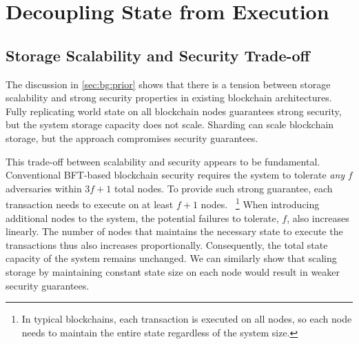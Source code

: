 \section{Decoupling State from Execution}
\label{sec:approach}

\subsection{Storage Scalability and Security Trade-off}
\label{sec:approach:tradeoff}

\fi

The discussion in \autoref{sec:bg:prior} shows that there is a tension between storage scalability and strong security properties in existing blockchain architectures.
Fully replicating world state on all blockchain nodes guarantees strong security, but the system storage capacity does not scale.
Sharding can scale blockchain storage, but the approach compromises security guarantees.

This trade-off between scalability and security appears to be fundamental.
Conventional BFT-based blockchain security requires the system to tolerate \emph{any} $f$ adversaries within $3f + 1$ total nodes.
To provide such strong guarantee, each transaction needs to execute on at least $f+1$ nodes.
~\footnote{In typical blockchains, each transaction is executed on all nodes, so each node needs to maintain the entire state regardless of the system size.}
When introducing additional nodes to the system, the potential failures to tolerate, $f$, also increases linearly.
The number of nodes that maintains the necessary state to execute the transactions thus also increases proportionally.
Consequently, the total state capacity of the system remains unchanged.
We can similarly show that scaling storage by maintaining constant state size on each node would result in weaker security guarantees.

